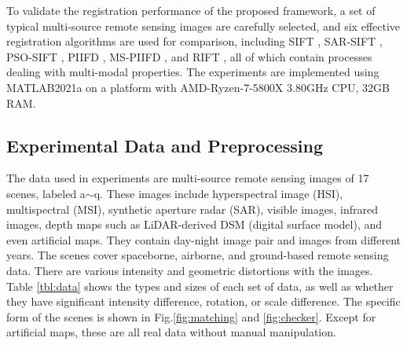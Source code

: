 To validate the registration performance of the proposed framework, a set of typical multi-source remote sensing images are carefully selected, and six effective registration algorithms are used for comparison, including SIFT \cite{lowe2004distinctive}, SAR-SIFT \cite{ma2016remote}, PSO-SIFT \cite{ma2016remote}, PIIFD \cite{chen2010partial}, MS-PIIFD \cite{2021Multi}, and RIFT \cite{li2019rift}, all of which contain processes dealing with multi-modal properties. The experiments are implemented using MATLAB2021a on a platform with AMD-Ryzen-7-5800X 3.80GHz CPU, 32GB RAM.



\subsection{Experimental Data and Preprocessing}
\label{ssec:data}
The data used in experiments are multi-source remote sensing images of 17 scenes, labeled a$\sim$q. These images include hyperspectral image (HSI), multispectral (MSI), synthetic aperture radar (SAR), visible images, infrared images, depth maps such as LiDAR-derived DSM (digital surface model), and even artificial maps. They contain day-night image pair and images from different years. The scenes cover spaceborne, airborne, and ground-based remote sensing data. There are various intensity and geometric distortions with the images. Table \ref{tbl:data} shows the types and sizes of each set of data, as well as whether they have significant intensity difference, rotation, or scale difference. The specific form of the scenes is shown in Fig.\ref{fig:matching} and \ref{fig:checker}. Except for artificial maps, these are all real data without manual manipulation.

